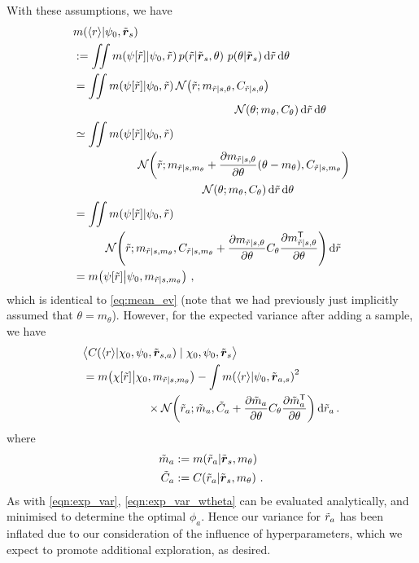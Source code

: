 \documentclass{article}
\begin{document}
With these assumptions, we have
\begin{align*}
& \mean{\inty{r}}{\psi_0,\tvr_s} \\
& \deq \iint \mean{\psi[\tr]}{\psi_0,\tr}
\p{\tr}{\tvr_s, \theta}\, \p{\theta}{\tvr_s}\ud \tr\,\ud \theta\\
& = \iint \mean{\psi[\tr]}{\psi_0,\tr} \N{\tr}{m_{\tr|s,\theta}}{C_{\tr|s,\theta}}
\\
& \hspace{5cm}\N{\theta}{m_\theta}{C_\theta}\ud \tr\,\ud \theta
\\
& \simeq \iint \mean{\psi[\tr]}{\psi_0,\tr} 
\\
& \hspace{2cm}\N{\tr}
{m_{\tr|s,m_\theta}+\pderiv{m_{\tr|s,\theta}}{\theta}(\theta-m_\theta)}
{C_{\tr|s,m_\theta}}
\\
& \hspace{4cm}
\N{\theta}{m_\theta}{C_\theta}\ud \tr\,\ud \theta
\\
& = \iint \mean{\psi[\tr]}{\psi_0,\tr} \\
& \hspace{1cm}\N{\tr}
{m_{\tr|s,m_\theta}}
{C_{\tr|s,m_\theta}+\pderiv{m_{\tr|s,\theta}}{\theta}C_\theta\pderiv{m\tra_{\tr|s,\theta}}{\theta}}
\ud \tr
\\
& = \mean{\psi[\tr]}{\psi_0,m_{\tr|s,m_\theta}}\,,
\end{align*}
which is identical to \eqref{eq:mean_ev} (note that we had previously just implicitly assumed that $\theta=m_\theta$). However, for the expected variance after adding a sample, we have
\begin{align}\label{eqn:exp_var_wtheta}
& \bigl\langle \cov{\langle r\rangle}{\chi_0,\psi_0,\tvr_{s,a}}\mid \chi_0,\psi_0,\tvr_{s}\bigr\rangle
\nonumber\\
& =  \mean{\chi[\tr]}{\chi_0,m_{\tr|s,m_\theta}}  - 
\int\mean{\inty{r}}{\psi_0,\tvr_{a,s}}^2
\nonumber\\
& \hspace{2cm}
\times\N{\tr_a}
{\tilde{m}_a }
{\tilde{C}_a +\pderiv{\tilde{m}_a}{\theta}C_\theta\pderiv{\tilde{m}\tra_a}{\theta}}
\ud\tr_a\,.
\end{align}
where
\begin{align*}
\tilde{m}_a & \deq \mean{\tr_a}{\tvr_s,m_\theta}\\
\tilde{C}_a & \deq \cov{\tr_a}{\tvr_s,m_\theta}\,.
\end{align*}
As with \eqref{eqn:exp_var}, \eqref{eqn:exp_var_wtheta} can be evaluated analytically, and minimised to determine the optimal $\phi_a$.
Hence our variance for $\tr_a$ has been inflated due to our consideration of the influence of hyperparameters, which we expect to promote additional exploration, as desired.




\end{document}
